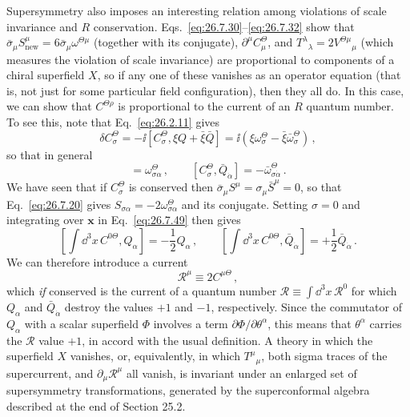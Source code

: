 Supersymmetry also imposes an interesting relation among violations of scale
invariance and \(R\) conservation. Eqs.~\eqref{eq:26.7.30}--\eqref{eq:26.7.32}
show that \(\bar\sigma_\mu S_{\mathrm{new}}^\mu
=6\bar\sigma_\mu\omega^{\Theta\mu}\) (together with its conjugate),
\(\partial^\mu C_\mu^\Theta\), and
\(T^\lambda{}_\lambda=2V^{\Theta\mu}{}_\mu\) (which measures the violation
of scale invariance) are proportional to components of a chiral superfield
\(X\), so if any one of these vanishes as an operator equation (that is, not
just for some particular field configuration), then they all do. In this
case, we can show that \(C^{\Theta\rho}\) is proportional to the current of
an \(R\) quantum number. To see this, note that Eq.~\eqref{eq:26.2.11} gives
\[
  \delta C_\sigma^\Theta
  =-\ii[C_\sigma^\Theta,\xi Q+\bar\xi\bar Q]
  =\ii(\xi\omega_\sigma^\Theta-\bar\xi\bar\omega_\sigma^\Theta)\,,
\]
so that in general
\begin{equation}
  [C_\sigma^\Theta,Q_\alpha]=\omega_{\sigma\alpha}^\Theta\,,
  \qquad
  [C_\sigma^\Theta,\bar Q_{\dot\alpha}]
  =-\bar\omega_{\sigma\dot\alpha}^\Theta\,.
  \tag{26.7.49}\label{eq:26.7.49}
\end{equation}
We have seen that if \(C_\sigma^\Theta\) is conserved then
\(\bar\sigma_\mu S^\mu=\sigma_\mu\bar S^\mu=0\), so that
Eq.~\eqref{eq:26.7.20} gives
\(S_{\sigma\alpha}=-2\omega_{\sigma\alpha}^\Theta\) and its conjugate.
Setting \(\sigma=0\) and integrating
over \(\mathbf{x}\) in Eq.~\eqref{eq:26.7.49} then gives
\begin{equation}
  \left[
    \int \dd^3x\,C^{0\Theta},Q_\alpha
  \right]
  =-\frac12Q_\alpha\,,
  \qquad
  \left[
    \int \dd^3x\,C^{0\Theta},\bar Q_{\dot\alpha}
  \right]
  =+\frac12\bar Q_{\dot\alpha}\,.
  \tag{26.7.50}\label{eq:26.7.50}
\end{equation}
We can therefore introduce a current
\begin{equation}
  \mathcal{R}^\mu\equiv2C^{\mu\Theta}\,,
  \tag{26.7.51}\label{eq:26.7.51}
\end{equation}
which \emph{if} conserved is the current of a quantum number
\(\mathcal{R}\equiv\int \dd^3x\,\mathcal{R}^0\) for which \(Q_\alpha\) and
\(\bar Q_{\dot\alpha}\)
destroy the values \(+1\) and \(-1\), respectively. Since the commutator of
\(Q_\alpha\) with a scalar superfield \(\Phi\) involves a term
\(\partial\Phi/\partial\theta^\alpha\), this means that \(\theta^\alpha\) carries the
\(\mathcal{R}\) value \(+1\), in accord with the usual definition. A theory
in which the superfield \(X\) vanishes, or, equivalently, in which
\(T^\mu{}_\mu\), both sigma traces of the supercurrent, and
\(\partial_\mu\mathcal{R}^\mu\)
all vanish, is invariant under an enlarged set of supersymmetry
transformations, generated by the superconformal algebra described at the
end of Section 25.2.

